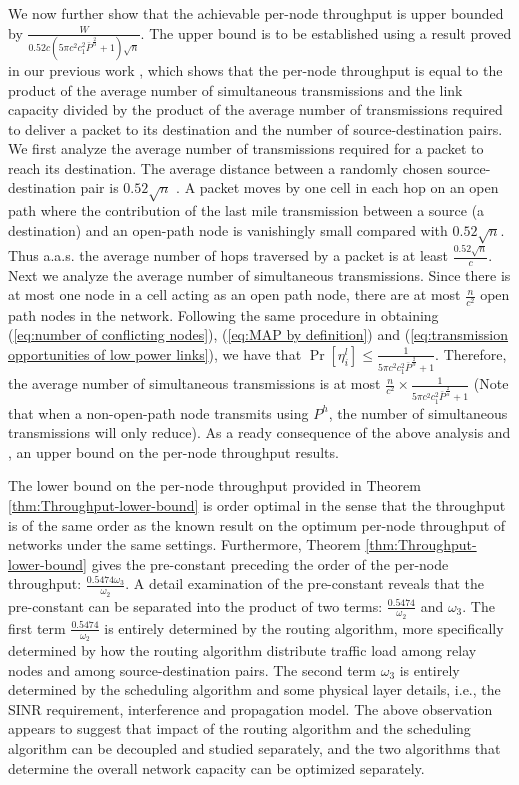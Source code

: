 \documentclass[english]{IEEEtran}
\theoremstyle{plain}
\theoremstyle{plain}
\theoremstyle{plain}
\theoremstyle{remark}
\begin{document}
\begin{IEEEproof}
We now further  show that the achievable per-node throughput is upper
bounded by $\frac{W}{0.52c\left(5\pi c^{2}c_{1}^{2}\bar{P}^{\frac{2}{\alpha}}+1\right)\sqrt{n}}$.
The upper bound is to be established using a result proved in our
previous work \cite[Corollary 6]{Mao13Towards}, which shows that
the per-node throughput is equal to the product of the average number
of simultaneous transmissions and the link capacity divided by the
product of the average number of transmissions required to deliver
a packet to its destination and the number of source-destination pairs.
We first analyze the average number of transmissions required for
a packet to reach its destination. The average distance between a
randomly chosen source-destination pair is $0.52\sqrt{n}$ \cite{Philip07The}.
A packet moves by one cell in each hop on an open path where the contribution
of the last mile transmission between a source (a destination) and
an open-path node is vanishingly small compared with $0.52\sqrt{n}$.
Thus a.a.s. the average number of hops traversed by a packet is at
least $\frac{0.52\sqrt{n}}{c}$. Next we analyze the average number
of simultaneous transmissions. Since there is at most one node in
a cell acting as an open path node, there are at most $\frac{n}{c^{2}}$
open path nodes in the network. Following the same procedure in obtaining
(\ref{eq:number of conflicting nodes}), (\ref{eq:MAP by definition})
and (\ref{eq:transmission opportunities of low power links}), we
have that $\Pr\left[\eta_{i}^{l}\right]\leq\frac{1}{5\pi c^{2}c_{1}^{2}\bar{P}^{\frac{2}{\alpha}}+1}$.
Therefore, the average number of simultaneous transmissions is at
most $\frac{n}{c^{2}}\times\frac{1}{5\pi c^{2}c_{1}^{2}\bar{P}^{\frac{2}{\alpha}}+1}$
(Note that when a non-open-path node transmits using $P^{h}$, the
number of simultaneous transmissions will only reduce). As a ready
consequence of the above analysis and \cite[Corollary 6]{Mao13Towards},
an upper bound on the per-node throughput results.
\end{IEEEproof}
The lower bound on the per-node throughput provided in Theorem \ref{thm:Throughput-lower-bound}
is order optimal in the sense that the throughput is of the same order
as the known result on the optimum per-node throughput \cite{Franceschetti07Closing}
of networks under the same settings. Furthermore, Theorem \ref{thm:Throughput-lower-bound}
gives the pre-constant preceding the order of the per-node throughput:
$\frac{0.5474\omega_{3}}{\omega_{2}}$. A detail examination of the
pre-constant reveals that the pre-constant can be separated into the
product of two terms: $\frac{0.5474}{\omega_{2}}$ and $\omega_{3}$.
The first term $\frac{0.5474}{\omega_{2}}$ is entirely determined
by the routing algorithm, more specifically determined by how the
routing algorithm distribute traffic load among relay nodes and among
source-destination pairs. The second term $\omega_{3}$ is entirely
determined by the scheduling algorithm and some physical layer details,
i.e., the SINR requirement, interference and propagation model. The
above observation appears to suggest that impact of the routing algorithm
and the scheduling algorithm can be decoupled and studied separately,
and the two algorithms that determine the overall network capacity
can be optimized separately.
\end{document}
